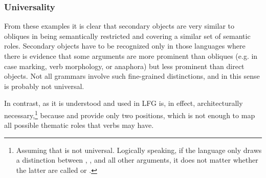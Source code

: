 \documentclass[output=paper]{../langscibook}
\begin{document}
 
 
\subsubsection{Universality\label{sect:gfs:obl-univ}} From these examples it is clear that secondary objects are very similar to obliques in being semantically restricted and covering a similar set of semantic roles. Secondary objects have to be recognized only in those languages where there is evidence that some arguments are more prominent than obliques (e.g. in case marking, verb morphology, or anaphora) but less prominent than direct objects. Not all grammars involve such fine-grained distinctions, and in this sense {\OBJTHETA} is probably not universal.
 
 In contrast, {\OBLTHETA} as it is understood and used in LFG is, in effect, architecturally necessary,\footnote{Assuming that {\OBJTHETA} is not universal. Logically speaking, if the language only draws a distinction between \SUBJ, \OBJ, and all other arguments, it does not matter whether the latter are called {\OBJTHETA} or {\OBLTHETA}.} because \SUBJ and \OBJ provide only two positions, which is not enough to map all possible thematic roles that verbs may have.
 
\end{document}

